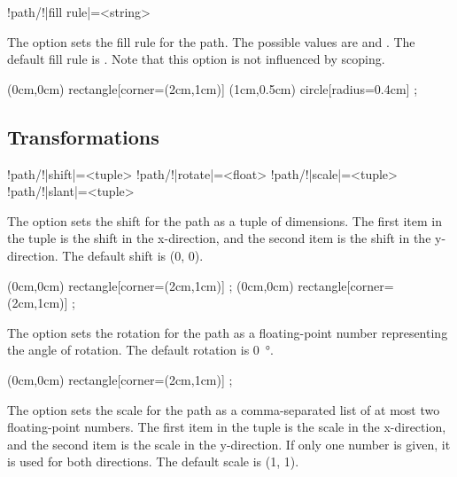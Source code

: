 \documentclass[a4paper]{article}
\begin{document}
{{\begin{macrodef}
!path/!|fill rule|={<string>}
\end{macrodef}
The option  sets the fill rule for the path. The possible values are  and . The default fill rule is . Note that this option is not influenced by scoping.

\begin{codeexamplecolumns}
\begin{qdraw}[fill rule={even-odd}]
  \fill (0cm,0cm)
    rectangle[corner={(2cm,1cm)}]
    (1cm,0.5cm)
    circle[radius={0.4cm}] ;
\end{qdraw}
\end{codeexamplecolumns}

\subsection{Transformations}

\begin{macrodef}
!path/!|shift|={<tuple>}
!path/!|rotate|={<float>}
!path/!|scale|={<tuple>}
!path/!|slant|={<tuple>}
\end{macrodef}
The option  sets the shift for the path as a tuple of dimensions. The first item in the tuple is the shift in the x-direction, and the second item is the shift in the y-direction. The default shift is (\qty{0}{\point}, \qty{0}{\point}).

\begin{codeexamplecolumns}
\begin{qdraw}
  \stroke[stroke color={blue}]
    (0cm,0cm) rectangle[corner={(2cm,1cm)}] ;
  \stroke[shift={(5pt,10pt)}] 
    (0cm,0cm) rectangle[corner={(2cm,1cm)}] ;
\end{qdraw}
\end{codeexamplecolumns}

The option  sets the rotation for the path as a floating-point number representing the angle of rotation. The default rotation is \qty{0}{\degree}.

\begin{codeexamplecolumns}
\begin{qdraw}
  \stroke[scale={0.25,0.5}]
    (0cm,0cm) rectangle[corner={(2cm,1cm)}] ;
\end{qdraw}
\end{codeexamplecolumns}

The option  sets the scale for the path as a comma-separated list of at most two floating-point numbers. The first item in the tuple is the scale in the x-direction, and the second item is the scale in the y-direction. If only one number is given, it is used for both directions. The default scale is (\num{1}, \num{1}).

}}
\end{document}
